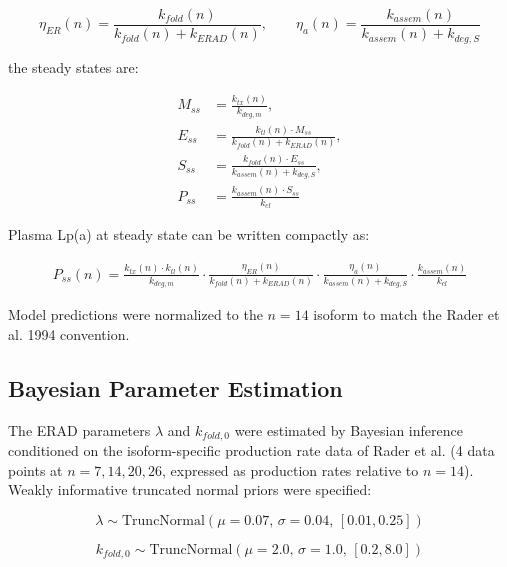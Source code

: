 \documentclass[12pt,letterpaper]{article}
\begin{document}
\begin{equation}\label{eq:10}
    \eta_{ER}(n) = \frac{k_{fold}(n)}{k_{fold}(n) + k_{ERAD}(n)}, \qquad \eta_a(n) = \frac{k_{assem}(n)}{k_{assem}(n) + k_{deg,S}}
\end{equation}

the steady states are:

\begin{align}
M_{ss} &= \frac{k_{tx}(n)}{k_{deg,m}},\label{eq:11} \\
E_{ss} &= \frac{k_{tl}(n) \cdot M_{ss}}{k_{fold}(n) + k_{ERAD}(n)}, \label{eq:12}\\
S_{ss} &= \frac{k_{fold}(n) \cdot E_{ss}}{k_{assem}(n) + k_{deg,S}}, \label{eq:13}\\
P_{ss} &= \frac{k_{assem}(n) \cdot S_{ss}}{k_{cl}} \label{eq:14}
\end{align}

Plasma Lp(a) at steady state can be written compactly as:

\begin{align} \label{eq:15}
    P_{ss}(n) = \frac{k_{tx}(n) \cdot k_{tl}(n)}{k_{deg,m}} \cdot \frac{\eta_{ER}(n)}{k_{fold}(n) + k_{ERAD}(n)} \cdot \frac{\eta_a(n)}{k_{assem}(n) + k_{deg,S}} \cdot \frac{k_{assem}(n)}{k_{cl}}
\end{align}

Model predictions were normalized to the $n = 14$ isoform to match the Rader et al. 1994 \citep{rader1994inverse} convention.

\subsection{Bayesian Parameter Estimation}\label{sec:bay}

The ERAD parameters $\lambda$ and $k_{fold,0}$ were estimated by Bayesian inference conditioned on the isoform-specific production rate data of Rader et al. \citep{rader1994inverse} (4 data points at $n = 7, 14, 20, 26$, expressed as production rates relative to $n = 14$). Weakly informative truncated normal priors were specified:

\begin{equation}\label{eq:16}
    \lambda \sim \text{TruncNormal}(\mu=0.07,\, \sigma=0.04,\, [0.01, 0.25])
\end{equation}

\begin{equation} \label{eq:17}
    k_{fold,0} \sim \text{TruncNormal}(\mu=2.0,\, \sigma=1.0,\, [0.2, 8.0])
\end{equation}
\end{document}
